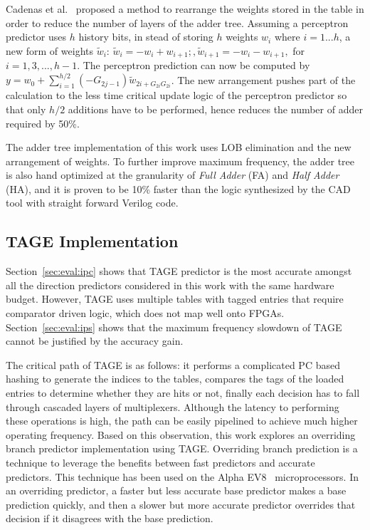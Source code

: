 \documentclass[conference]{IEEEtran}
\begin{document}
Cadenas et al.~\cite{perceptronRearrange} proposed a method to rearrange the weights stored in the table in order to reduce the number of layers of the adder tree. Assuming a perceptron predictor uses $h$ history bits, in stead of storing $h$ weights $w_i$ where $i = 1 ... h$, a new form of weights $\widetilde{w}_i$: $\widetilde{w}_i = - w_i + w_{i+1};, \widetilde{w}_{i+1} = - w_i - w_{i+1},$ for $i = 1, 3, ..., h-1$. The perceptron prediction can now be computed by $y = w_0 + \sum_{i=1}^{h/2}(-G_{2j-1})\widetilde{w}_{2i+G_{2i}G_{2i}}$. The new arrangement pushes part of the calculation to the less time critical update logic of the perceptron predictor so that only $h/2$ additions have to be performed, hence reduces the number of adder required by 50\%.

The adder tree implementation of this work uses LOB elimination and the new arrangement of weights. To further improve maximum frequency, the adder tree is also hand optimized at the granularity of \textit{Full Adder} (FA) and \textit{Half Adder} (HA), and it is proven to be 10\% faster than the logic synthesized by the CAD tool with straight forward Verilog code.


\subsection{TAGE Implementation}
\label{sec:fpga:tage}
Section~\ref{sec:eval:ipc} shows that TAGE predictor is the most accurate amongst all the direction predictors considered in this work with the same hardware budget. However, TAGE uses multiple tables with tagged entries that require comparator driven logic, which does not map well onto FPGAs. Section~\ref{sec:eval:ips} shows that the maximum frequency slowdown of TAGE cannot be justified by the accuracy gain.

The critical path of TAGE is as follows: it performs a complicated PC based hashing to generate the indices to the tables, compares the tags of the loaded entries to determine whether they are hits or not, finally each decision has to fall through cascaded layers of multiplexers. Although the latency to performing these operations is high, the path can be easily pipelined to achieve much higher operating frequency. Based on this observation, this work explores an overriding branch predictor implementation using TAGE. Overriding branch prediction is a technique to leverage the benefits between fast predictors and accurate predictors. This technique has been used on the Alpha EV8~\cite{alphaEV8} microprocessors. In an overriding predictor, a faster but less accurate base predictor makes a base prediction quickly, and then a slower but more accurate predictor overrides that decision if it disagrees with the base prediction. 
\end{document}
